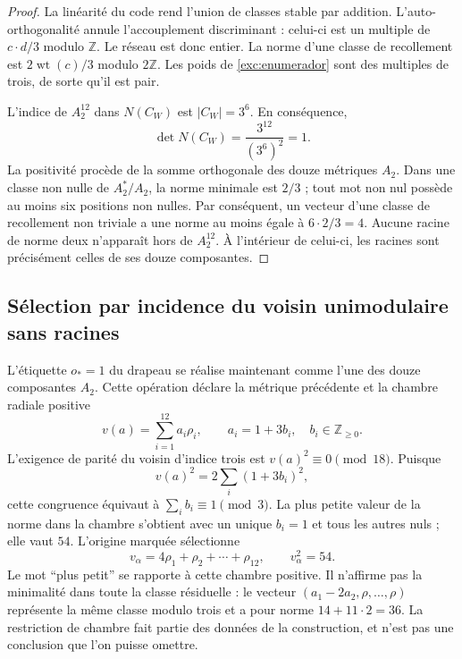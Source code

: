 \begin{proof}
La linéarité du code rend l'union de classes stable par addition. L'auto-orthogonalité annule l'accouplement discriminant : celui-ci est un multiple de $c\cdot d/3$ modulo $\mathbb Z$. Le réseau est donc entier. La norme d'une classe de recollement est $2\operatorname{wt}(c)/3$ modulo $2\mathbb Z$. Les poids de \eqref{exc:enumerador} sont des multiples de trois, de sorte qu'il est pair.

L'indice de $A_2^{12}$ dans $N(C_W)$ est $|C_W|=3^6$. En conséquence,
\[
 \det N(C_W)=\frac{3^{12}}{(3^6)^2}=1.
\]
La positivité procède de la somme orthogonale des douze métriques $A_2$.
Dans une classe non nulle de $A_2^*/A_2$, la norme minimale est $2/3$ ;
tout mot non nul possède au moins six positions non nulles.
Par conséquent, un vecteur d'une classe de recollement non triviale a une norme
au moins égale à $6\cdot2/3=4$. Aucune racine de norme deux n'apparaît hors de
$A_2^{12}$. À l'intérieur de celui-ci, les racines sont précisément celles de ses
douze composantes.
\end{proof}

\subsection{Sélection par incidence du voisin unimodulaire sans racines}
\label{exc:leech}



L'étiquette $o_*=1$ du drapeau se réalise maintenant comme l'une des
douze composantes $A_2$. Cette opération déclare la métrique précédente et
la chambre radiale positive
\[
 v(a)=\sum_{i=1}^{12}a_i\rho_i,
 \qquad a_i=1+3b_i,\quad b_i\in\mathbb Z_{\geq0}.
\]
L'exigence de parité du voisin d'indice trois est $v(a)^2\equiv0\pmod{18}$. Puisque
\[
 v(a)^2=2\sum_i(1+3b_i)^2,
\]
cette congruence équivaut à $\sum_i b_i\equiv1\pmod3$. La plus petite
valeur de la norme dans la chambre s'obtient avec un unique $b_i=1$ et
tous les autres nuls ; elle vaut $54$. L'origine marquée sélectionne
\begin{equation}
 v_\alpha=4\rho_1+\rho_2+\cdots+\rho_{12},
 \qquad v_\alpha^2=54.
 \label{exc:vector}
\end{equation}
Le mot ``plus petit'' se rapporte à cette chambre positive. Il n'affirme pas la minimalité dans toute la classe résiduelle : le vecteur $(a_1-2a_2,\rho,\ldots,\rho)$ représente la même classe modulo trois et a pour norme $14+11\cdot2=36$. La restriction de chambre fait partie des données de la construction, et n'est pas une conclusion que l'on puisse omettre.

